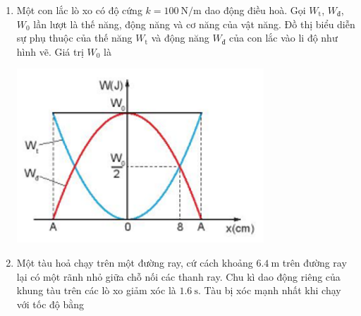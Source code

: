 \begin{enumerate}[label=\bfseries Câu \arabic*:]
\item Một con lắc lò xo có độ cứng $k=\SI{100}{\newton/\meter}$ dao động điều hoà. Gọi $W_\text{t}$, $W_\text{đ}$, $W_0$ lần lượt là thế năng, động năng và cơ năng của vật năng. Đồ thị biểu diễn sự phụ thuộc của thế năng $W_\text{t}$ và động năng $W_\text{đ}$ của con lắc vào li độ như hình vẽ. Giá trị $W_0$ là
\begin{center}
	\includegraphics[width=0.4\linewidth]{../figs/C1-Q-6}
\end{center}

\item Một tàu hoả chạy trên một đường ray, cứ cách khoảng $\SI{6.4}{\meter}$ trên đường ray lại có một rãnh nhỏ giữa chỗ nối các thanh ray. Chu kì dao động riêng của khung tàu trên các lò xo giảm xóc là $\SI{1.6}{\second}$. Tàu bị xóc mạnh nhất khi chạy với tốc độ bằng
\end{enumerate}